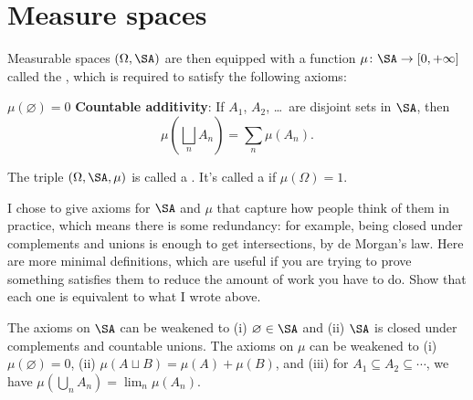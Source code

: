 \section{Measure spaces}
\begin{definition}
	Measurable spaces $(\Omega, \SA)$ are then equipped
	with a function $\mu \colon \SA \to [0, +\infty]$
	called the , which is required to satisfy
	the following axioms:
	\begin{itemize}
		\ii $\mu(\varnothing) = 0$
		\ii \textbf{Countable additivity}:
		If $A_1$, $A_2$, \dots\ are disjoint sets in $\SA$,
		then \[ \mu\left( \bigsqcup_n A_n \right) = \sum_n \mu(A_n). \]
	\end{itemize}
	The triple $(\Omega, \SA, \mu)$ is called a .
	It's called a  if $\mu(\Omega) = 1$.
\end{definition}
\begin{exercise}
	I chose to give axioms for $\SA$ and $\mu$
	that capture how people think of them in practice,
	which means there is some redundancy:
	for example, being closed under complements and unions
	is enough to get intersections, by de Morgan's law.
	Here are more minimal definitions,
	which are useful if you are trying to prove something satisfies them
	to reduce the amount of work you have to do.
	Show that each one is equivalent to what I wrote above.
	\begin{enumerate}[(a)]
		\ii The axioms on $\SA$ can be weakened
		to (i) $\varnothing \in \SA$ and (ii) $\SA$ is closed under
		complements and countable unions.
		\ii The axioms on $\mu$ can be weakened to
		(i) $\mu(\varnothing) = 0$,
		(ii) $\mu(A \sqcup B) = \mu(A) + \mu(B)$, and
		(iii) for $A_1 \subseteq A_2 \subseteq \cdots$,
		we have $\mu\left( \bigcup_n A_n \right) = \lim_n \mu(A_n)$.
	\end{enumerate}
\end{exercise}


